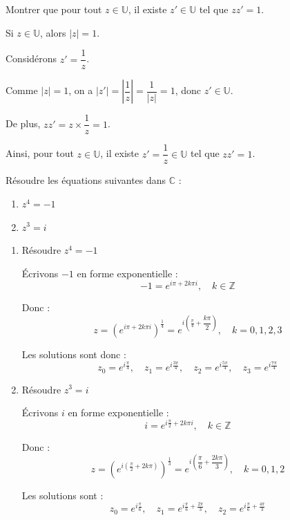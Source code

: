 \documentclass[a4paper,12pt]{article}
\begin{document}
\begin{tcolorbox}[title={Exercice 8 - [Raisonner]}]
Montrer que pour tout \( z \in \mathbb{U} \), il existe \( z' \in \mathbb{U} \) tel que \( zz' = 1 \).
\end{tcolorbox}

\begin{solutionbox}
Si \( z \in \mathbb{U} \), alors \( |z| = 1 \).

Considérons \( z' = \dfrac{1}{z} \).

Comme \( |z| = 1 \), on a \( |z'| = \left| \dfrac{1}{z} \right| = \dfrac{1}{|z|} = 1 \), donc \( z' \in \mathbb{U} \).

De plus, \( zz' = z \times \dfrac{1}{z} = 1 \).

Ainsi, pour tout \( z \in \mathbb{U} \), il existe \( z' = \dfrac{1}{z} \in \mathbb{U} \) tel que \( zz' = 1 \).
\end{solutionbox}

\begin{tcolorbox}[title=Exercice 9 - {[}Calculer{]}]
Résoudre les équations suivantes dans \( \mathbb{C} \) :
\begin{enumerate}
    \item \( z^4 = -1 \)
    \item \( z^3 = i \)
\end{enumerate}
\end{tcolorbox}

\begin{solutionbox}
\begin{enumerate}
    \item Résoudre \( z^4 = -1 \)

    Écrivons \( -1 \) en forme exponentielle :
    \[
    -1 = e^{i\pi + 2k\pi i}, \quad k \in \mathbb{Z}
    \]

    Donc :
    \[
    z = \left( e^{i\pi + 2k\pi i} \right)^{\frac{1}{4}} = e^{i\left( \frac{\pi}{4} + \dfrac{k\pi}{2} \right)}, \quad k = 0, 1, 2, 3
    \]

    Les solutions sont donc :
    \[
    z_0 = e^{i\frac{\pi}{4}}, \quad z_1 = e^{i\frac{3\pi}{4}}, \quad z_2 = e^{i\frac{5\pi}{4}}, \quad z_3 = e^{i\frac{7\pi}{4}}
    \]

    \item Résoudre \( z^3 = i \)

    Écrivons \( i \) en forme exponentielle :
    \[
    i = e^{i\frac{\pi}{2} + 2k\pi i}, \quad k \in \mathbb{Z}
    \]

    Donc :
    \[
    z = \left( e^{i\left( \frac{\pi}{2} + 2k\pi \right)} \right)^{\frac{1}{3}} = e^{i\left( \dfrac{\pi}{6} + \dfrac{2k\pi}{3} \right)}, \quad k = 0, 1, 2
    \]

    Les solutions sont :
    \[
    z_0 = e^{i\frac{\pi}{6}}, \quad z_1 = e^{i\frac{\pi}{6} + \frac{2\pi}{3}}, \quad z_2 = e^{i\frac{\pi}{6} + \frac{4\pi}{3}}
    \]
\end{enumerate}
\end{solutionbox}
\end{document}
